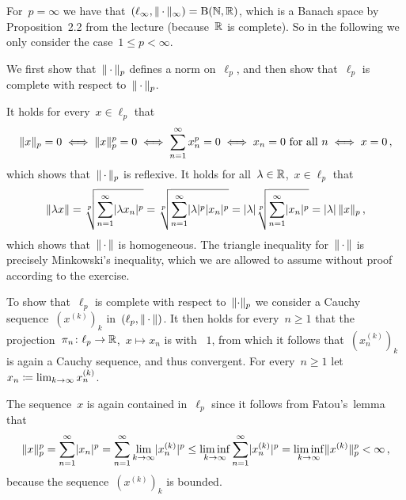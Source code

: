 \section{}





\subsection{}

For~$p = \infty$ we have that~$(\ell_\infty, \lVert\,\cdot\,\rVert_\infty) = \operatorname{B}(\mathbb{N}, \mathbb{R})$, which is a Banach space  by Proposition~2.2 from the lecture (because~$\mathbb{R}$ is complete).
So in the following we only consider the case~$1 \leq p < \infty$.

We first show that~$\lVert\,\cdot\,\rVert_p$ defines a norm on~$\ell_p$, and then show that~$\ell_p$ is complete with respect to~$\lVert\,\cdot\,\rVert_p$.

It holds for every~$x \in \ell_p$ that
\[
        \lVert x\rVert_p = 0
  \iff  \lVert x\rVert_p^p = 0
  \iff  \sum_{n=1}^\infty x_n^p = 0
  \iff  \text{$x_n = 0$ for all~$n$}
  \iff  x = 0 \,,
\]
which shows that~$\lVert\,\cdot\,\rVert_p$ is reflexive.
It holds for all~$\lambda \in \mathbb{R}$,~$x \in \ell_p$ that
\[
    \lVert\lambda x\rVert
  = \sqrt[p]{ \sum_{n=1}^\infty \lvert\lambda x_n\rvert^p }
  = \sqrt[p]{ \sum_{n=1}^\infty \lvert\lambda\rvert^p \lvert x_n\rvert^p }
  = \lvert\lambda\rvert \sqrt[p]{ \sum_{n=1}^\infty \lvert x_n\rvert^p }
  = \lvert\lambda\rvert \, \lVert x\rVert_p \,,
\]
which shows that~$\lVert\,\cdot\,\rVert$ is homogeneous.
The triangle inequality for~$\lVert\,\cdot\,\rVert$ is precisely Minkowski’s inequality, which we are allowed to assume without proof according to the exercise.

To show that~$\ell_p$ is complete with respect to~$\lVert\cdot\rVert_p$ we consider a Cauchy sequence~$(x^{(k)})_k$ in~$(\ell_p, \lVert\,\cdot\,\rVert)$.
It then holds for every~$n \geq 1$ that the projection~$\pi_n \colon \ell_p \to \mathbb{R}$,~$x \mapsto x_n$ is {\lipcont} with {\lipconst}~$1$, from which it follows that~$(x^{(k)}_n)_k$ is again a Cauchy sequence, and thus convergent.
For every~$n \geq 1$ let~$x_n \coloneqq \lim_{k \to \infty} x^{(k)}_n$.

The sequence~$x$ is again contained in~$\ell_p$ since it follows from Fatou’s~lemma that
\[
        \lVert x\rVert_p^p
  =     \sum_{n=1}^\infty \lvert x_n\rvert^p
  =     \sum_{n=1}^\infty \lim_{k \to \infty} \lvert x_n^{(k)}\rvert^p
  \leq  \liminf_{k \to \infty} \sum_{n=1}^\infty \lvert x_n^{(k)}\rvert^p
  =     \liminf_{k \to \infty} \lVert x^{(k)}\rVert_p^p
  <     \infty \,,
\]
because the sequence~$(x^{(k)})_k$ is bounded.

